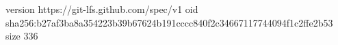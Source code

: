 version https://git-lfs.github.com/spec/v1
oid sha256:b27af3ba8a354223b39b67624b191cccc840f2c34667117744094f1c2ffe2b53
size 336
